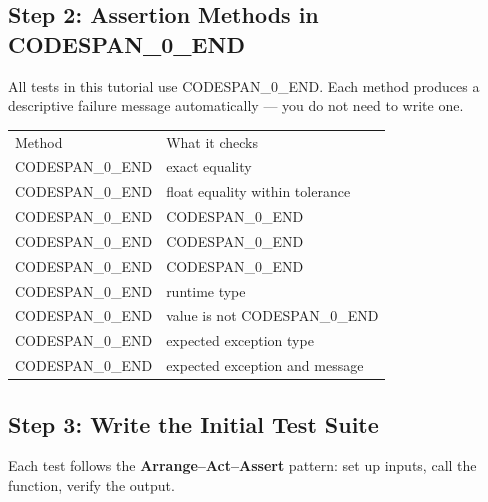 \documentclass[11pt,a4paper]{book}
\begin{document}
\medskip

\subsection{Step 2: Assertion Methods in CODESPAN\_0\_END}

All tests in this tutorial use CODESPAN\_0\_END. Each method produces a descriptive failure message automatically --- you do not need to write one.

\begin{tabular}{ll}
\hline
Method & What it checks \\
CODESPAN\_0\_END & exact equality \\
CODESPAN\_0\_END & float equality within tolerance \\
CODESPAN\_0\_END & CODESPAN\_0\_END \\
CODESPAN\_0\_END & CODESPAN\_0\_END \\
CODESPAN\_0\_END & CODESPAN\_0\_END \\
CODESPAN\_0\_END & runtime type \\
CODESPAN\_0\_END & value is not CODESPAN\_0\_END \\
CODESPAN\_0\_END & expected exception type \\
CODESPAN\_0\_END & expected exception and message \\
\hline
\end{tabular}

\medskip

\subsection{Step 3: Write the Initial Test Suite}

Each test follows the \textbf{Arrange--Act--Assert} pattern: set up inputs, call the function, verify the output.
\end{document}
